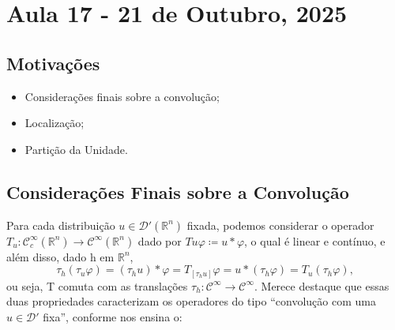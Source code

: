 \documentclass[../distribution_theory_notes.tex]{subfiles}
\begin{document}
\section{Aula 17 - 21 de Outubro, 2025}
\subsection{Motivações}
\begin{itemize}
	\item Considerações finais sobre a convolução;
	\item Localização;
	\item Partição da Unidade.
\end{itemize}
\subsection{Considerações Finais sobre a Convolução}
Para cada distribuição \(u\in \mathcal{D}'(\mathbb{R}^{n})\) fixada, podemos considerar o operador \(T_u:\mathcal{C}_{c}^{\infty}(\mathbb{R}^{n})\rightarrow \mathcal{C}^{\infty}(\mathbb{R}^{n})\) dado por \(Tu\varphi \coloneqq u*\varphi \), o qual é linear e contínuo, e além disso,
dado h em \(\mathbb{R}^{n}\),
\[
	\tau_{h}(\tau_{u}\varphi ) = (\tau_{h}u)*\varphi  = T_{[\tau_{h}u]}\varphi  = u * (\tau_{h}\varphi ) = T_{u}(\tau_{h}\varphi ),
\]
ou seja, T comuta com as translações \(\tau_{h}:\mathcal{C}^{\infty}\rightarrow \mathcal{C}^{\infty}\). Merece destaque que essas duas propriedades caracterizam os operadores do tipo ``convolução com uma \(u\in \mathcal{D}'\) fixa'', conforme nos ensina o:
\end{document}

